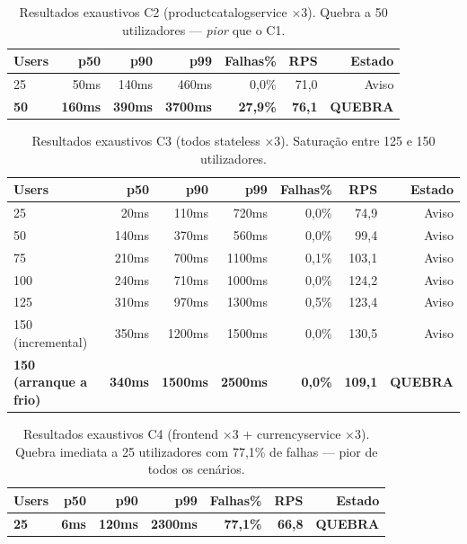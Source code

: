 \documentclass[acmsmall,screen=true,nonacm]{acmart}
\begin{document}
\begin{table}[h]
\caption{Resultados exaustivos C2 (productcatalogservice ×3). Quebra a 50 utilizadores — \emph{pior} que o C1.}
\label{tab:c2ex}
\begin{tabular}{lrrrrrr}
\toprule
\textbf{Users} & \textbf{p50} & \textbf{p90} & \textbf{p99} & \textbf{Falhas\%} & \textbf{RPS} & \textbf{Estado} \\
\midrule
25 & 50ms & 140ms & 460ms & 0,0\% & 71,0 & Aviso \\
\textbf{50} & \textbf{160ms} & \textbf{390ms} & \textbf{3700ms} & \textbf{27,9\%} & \textbf{76,1} & \textbf{QUEBRA} \\
\bottomrule
\end{tabular}
\end{table}

\begin{table}[h]
\caption{Resultados exaustivos C3 (todos stateless ×3). Saturação entre 125 e 150 utilizadores.}
\label{tab:c3ex}
\begin{tabular}{lrrrrrr}
\toprule
\textbf{Users} & \textbf{p50} & \textbf{p90} & \textbf{p99} & \textbf{Falhas\%} & \textbf{RPS} & \textbf{Estado} \\
\midrule
25 & 20ms & 110ms & 720ms & 0,0\% & 74,9 & Aviso \\
50 & 140ms & 370ms & 560ms & 0,0\% & 99,4 & Aviso \\
75 & 210ms & 700ms & 1100ms & 0,1\% & 103,1 & Aviso \\
100 & 240ms & 710ms & 1000ms & 0,0\% & 124,2 & Aviso \\
125 & 310ms & 970ms & 1300ms & 0,5\% & 123,4 & Aviso \\
150 (incremental) & 350ms & 1200ms & 1500ms & 0,0\% & 130,5 & Aviso \\
\textbf{150 (arranque a frio)} & \textbf{340ms} & \textbf{1500ms} & \textbf{2500ms} & \textbf{0,0\%} & \textbf{109,1} & \textbf{QUEBRA} \\
\bottomrule
\end{tabular}
\end{table}

\begin{table}[h]
\caption{Resultados exaustivos C4 (frontend ×3 + currencyservice ×3). Quebra imediata a 25 utilizadores com 77,1\% de falhas — pior de todos os cenários.}
\label{tab:c4ex}
\begin{tabular}{lrrrrrr}
\toprule
\textbf{Users} & \textbf{p50} & \textbf{p90} & \textbf{p99} & \textbf{Falhas\%} & \textbf{RPS} & \textbf{Estado} \\
\midrule
\textbf{25} & \textbf{6ms} & \textbf{120ms} & \textbf{2300ms} & \textbf{77,1\%} & \textbf{66,8} & \textbf{QUEBRA} \\
\bottomrule
\end{tabular}
\end{table}
\end{document}
